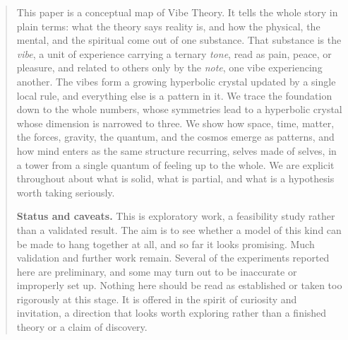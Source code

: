 \begin{abstract}
This paper is a conceptual map of Vibe Theory. It tells the whole story in plain terms: what the theory says reality
is, and how the physical, the mental, and the spiritual come out of one substance. That
substance is the \emph{vibe}, a unit of experience carrying a ternary \emph{tone}, read as pain,
peace, or pleasure, and related to others only by the \emph{note}, one vibe experiencing
another. The vibes form a growing hyperbolic crystal updated by a single local rule, and
everything else is a pattern in it. We trace the foundation down to the whole numbers, whose
symmetries lead to a hyperbolic crystal whose dimension is narrowed to three. We show how space,
time, matter, the forces, gravity, the quantum, and the cosmos emerge as patterns, and how mind
enters as the same structure recurring, selves made of selves, in a tower from a single quantum
of feeling up to the whole. We are explicit throughout about what is solid, what is partial, and
what is a hypothesis worth taking seriously.
\medskip

\noindent\textbf{Status and caveats.} This is exploratory work, a feasibility study rather than a validated result. The aim is to see whether a model of this kind can be made to hang together at all, and so far it looks promising. Much validation and further work remain. Several of the experiments reported here are preliminary, and some may turn out to be inaccurate or improperly set up. Nothing here should be read as established or taken too rigorously at this stage. It is offered in the spirit of curiosity and invitation, a direction that looks worth exploring rather than a finished theory or a claim of discovery.
\end{abstract}
